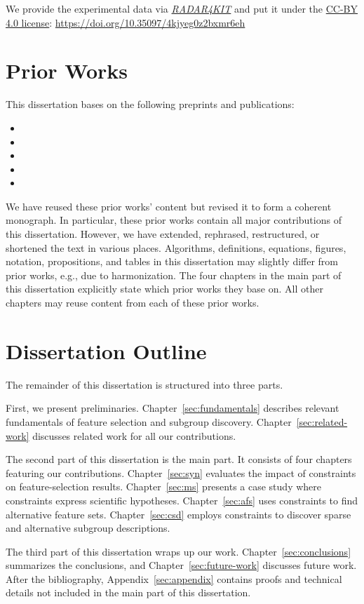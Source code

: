 We provide the experimental data via \href{https://radar.kit.edu}{\emph{RADAR4KIT}} and put it under the \href{https://creativecommons.org/licenses/by/4.0/}{CC-BY 4.0 license}: \url{https://doi.org/10.35097/4kjyeg0z2bxmr6eh}

\section{Prior Works}
\label{sec:introduction:prior-works}

This dissertation bases on the following preprints and publications:
%
\begin{itemize}
	\item {}
	\item {}
	\item {}
	\item {}
	\item {}
\end{itemize}
%
We have reused these prior works' content but revised it to form a coherent monograph.
In particular, these prior works contain all major contributions of this dissertation.
However, we have extended, rephrased, restructured, or shortened the text in various places.
Algorithms, definitions, equations, figures, notation, propositions, and tables in this dissertation may slightly differ from prior works, e.g., due to harmonization.
The four chapters in the main part of this dissertation explicitly state which prior works they base on.
All other chapters may reuse content from each of these prior works.

\section{Dissertation Outline}
\label{sec:introduction:outline}

The remainder of this dissertation is structured into three parts.

First, we present preliminaries.
Chapter~\ref{sec:fundamentals} describes relevant fundamentals of feature selection and subgroup discovery.
Chapter~\ref{sec:related-work} discusses related work for all our contributions.

The second part of this dissertation is the main part.
It consists of four chapters featuring our contributions.
Chapter~\ref{sec:syn} evaluates the impact of constraints on feature-selection results.
Chapter~\ref{sec:ms} presents a case study where constraints express scientific hypotheses.
Chapter~\ref{sec:afs} uses constraints to find alternative feature sets.
Chapter~\ref{sec:csd} employs constraints to discover sparse and alternative subgroup descriptions.

The third part of this dissertation wraps up our work.
Chapter~\ref{sec:conclusions} summarizes the conclusions, and Chapter~\ref{sec:future-work} discusses future work.
After the bibliography, Appendix~\ref{sec:appendix} contains proofs and technical details not included in the main part of this dissertation.
